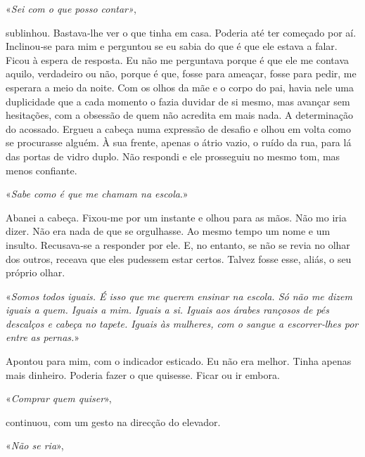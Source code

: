 «\emph{Sei com o que posso contar»},

sublinhou. Bastava­‑lhe ver o que tinha em casa. Poderia até ter
começado por aí. Inclinou­‑se para mim e perguntou se eu sabia do que é
que ele estava a falar. Ficou à espera de resposta. Eu não me perguntava
porque é que ele me contava aquilo, verdadeiro ou não, porque é que,
fosse para ameaçar, fosse para pedir, me esperara a meio da noite. Com
os olhos da mãe e o corpo do pai, havia nele uma duplicidade que a cada
momento o fazia duvidar de si mesmo, mas avançar sem hesitações, com a
obsessão de quem não acredita em mais nada. A determinação do acossado.
Ergueu a cabeça numa expressão de desafio e olhou em volta como se
procurasse alguém. À sua frente, apenas o átrio vazio, o ruído da rua,
para lá das portas de vidro duplo. Não respondi e ele prosseguiu no
mesmo tom, mas menos confiante.

«\emph{Sabe como é que me chamam na escola}.»

Abanei a cabeça. Fixou­‑me por um instante e olhou para as mãos. Não mo
iria dizer. Não era nada de que se orgulhasse. Ao mesmo tempo um nome e
um insulto. Recusava­‑se a responder por ele. E, no entanto, se não se
revia no olhar dos outros, receava que eles pudessem estar certos.
Talvez fosse esse, aliás, o seu próprio olhar.

«\emph{Somos todos iguais. É isso que me querem ensinar na escola. Só
não me dizem iguais a quem. Iguais a mim. Iguais a si. Iguais aos árabes
rançosos de pés descalços e cabeça no tapete. Iguais às mulheres, com o
sangue a escorrer­‑lhes por entre as pernas.}»

Apontou para mim, com o indicador esticado. Eu não era melhor. Tinha
apenas mais dinheiro. Poderia fazer o que quisesse. Ficar ou ir embora.

«\emph{Comprar quem quiser}»,

continuou, com um gesto na direcção do elevador.

«\emph{Não se ria}»,

